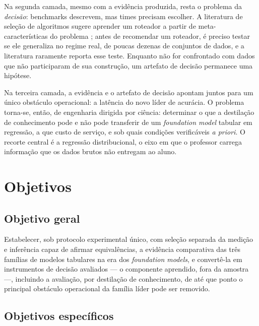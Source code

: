 Na segunda camada, mesmo com a evidência produzida, resta o problema da
\emph{decisão}: benchmarks descrevem, mas times precisam escolher. A
literatura de seleção de algoritmos sugere aprender um roteador a partir
de meta-características do problema \citep{rice1976}; antes de
recomendar um roteador, é preciso
testar se ele generaliza no regime real, de poucas dezenas de
conjuntos de dados, e a literatura raramente
reporta esse teste. Enquanto não for confrontado com
dados que não participaram de sua construção, um artefato de decisão
permanece uma hipótese.

Na terceira camada, a evidência e o artefato de decisão apontam juntos
para um único obstáculo operacional: a latência do novo líder de acurácia.
O problema torna-se, então, de engenharia dirigida por ciência: determinar
o que a destilação de conhecimento pode e não pode transferir de um
\emph{foundation model} tabular em regressão, a que custo de serviço, e
sob quais condições verificáveis \emph{a priori}. O recorte central é
a regressão
distribucional, o eixo em que o professor carrega informação que os dados
brutos não entregam ao aluno.

\section{Objetivos}
\label{sec:intro-objetivos}

\subsection{Objetivo geral}

Estabelecer, sob protocolo experimental único, com seleção separada da
medição e inferência capaz de afirmar equivalências, a evidência
comparativa das três famílias de
modelos tabulares na era dos \emph{foundation models}, e convertê-la em
instrumentos de decisão avaliados --- o componente aprendido, fora da
amostra ---, incluindo a avaliação, por
destilação de conhecimento, de até que ponto o principal obstáculo
operacional da família líder pode ser removido.

\subsection{Objetivos específicos}

